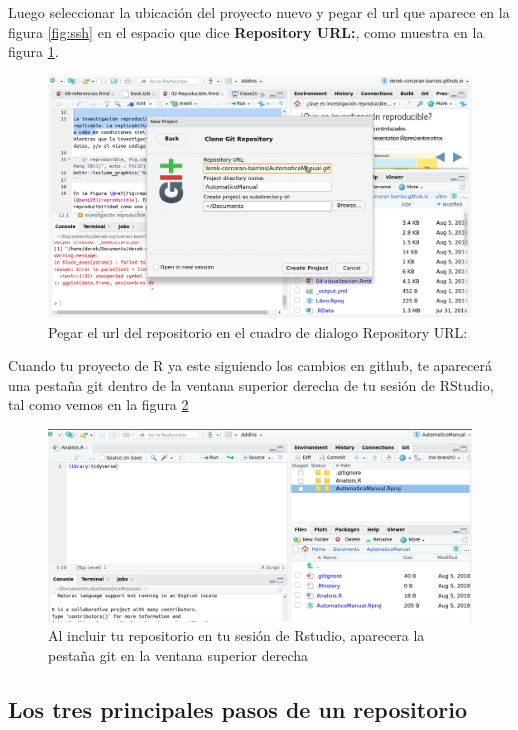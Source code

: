 \documentclass[]{book}
\begin{document}
Luego seleccionar la ubicación del proyecto nuevo y pegar el url que
aparece en la figura \ref{fig:ssh} en el espacio que dice
\textbf{Repository URL:}, como muestra en la figura
\ref{fig:GitRstudio}.

\begin{figure}

{\centering \includegraphics[width=0.8\linewidth]{GitRstudio} 

}

\caption{Pegar el url del repositorio en el cuadro de dialogo Repository URL:}\label{fig:GitRstudio}
\end{figure}

Cuando tu proyecto de R ya este siguiendo los cambios en github, te
aparecerá una pestaña git dentro de la ventana superior derecha de tu
sesión de RStudio, tal como vemos en la figura \ref{fig:GitPan}

\begin{figure}

{\centering \includegraphics[width=0.8\linewidth]{GitPan} 

}

\caption{Al incluir tu repositorio en tu sesión de Rstudio, aparecera la pestaña git en la ventana superior derecha}\label{fig:GitPan}
\end{figure}

\hypertarget{los-tres-principales-pasos-de-un-repositorio}{%
\subsection{Los tres principales pasos de un
repositorio}\label{los-tres-principales-pasos-de-un-repositorio}}
\end{document}

